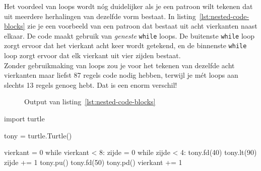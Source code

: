 \documentclass[../main]{subfiles}
\begin{document}
Het voordeel van loops wordt nóg duidelijker als je een patroon wilt tekenen dat uit meerdere herhalingen van dezelfde vorm bestaat. In listing~\ref{lst:nested-code-blocks} zie je een voorbeeld van een patroon dat bestaat uit acht vierkanten naast elkaar. De code maakt gebruik van \emph{geneste} \texttt{while} loops. De buitenste \texttt{while} loop zorgt ervoor dat het vierkant acht keer wordt getekend, en de binnenste \texttt{while} loop zorgt ervoor dat elk vierkant uit vier zijden bestaat.\\
Zonder gebruikmaking van loops zou je voor het tekenen van dezelfde acht vierkanten maar liefst 87 regels code nodig hebben, terwijl je mét loops aan slechts 13 regels genoeg hebt. Dat is een enorm verschil!

\begin{figure}[ht]
    \centering
    \caption{Output van listing~\ref{lst:nested-code-blocks}}%
    \label{fig:turtle-squares}
\end{figure}

\begin{python}[style=mu, caption={Geneste \texttt{if} statements}, label={lst:nested-code-blocks},name=nestedcodeblocks, framextopmargin=3pt, framexleftmargin=3pt, lineskip=3pt,]
import turtle

tony = turtle.Turtle()

vierkant = 0
while vierkant < 8:
    zijde = 0
    while zijde < 4:
        tony.fd(40)
        tony.lt(90)
        zijde += 1
    tony.pu()
    tony.fd(50)
    tony.pd()
    vierkant += 1
\end{python}
\end{document}
